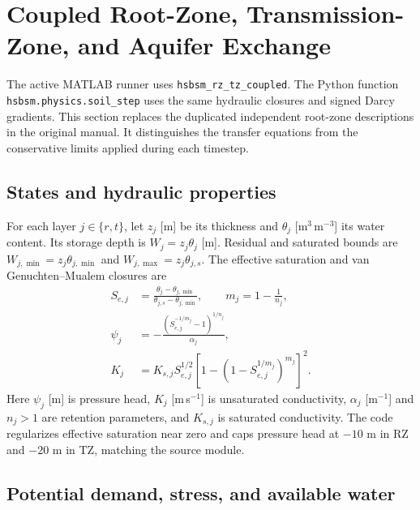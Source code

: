 \section{Coupled Root-Zone, Transmission-Zone, and Aquifer Exchange}
\label{sec:rootzone}
\label{subsec:tz_dynamics}

The active MATLAB runner uses \texttt{hsbsm\_rz\_tz\_coupled}. The Python function \texttt{hsbsm.physics.soil\_step} uses the same hydraulic closures and signed Darcy gradients. This section replaces the duplicated independent root-zone descriptions in the original manual. It distinguishes the transfer equations from the conservative limits applied during each timestep.

\subsection{States and hydraulic properties}

For each layer $j\in\{r,t\}$, let $z_j$ [m] be its thickness and $\theta_j$ [m$^3$\,m$^{-3}$] its water content. Its storage depth is $W_j=z_j\theta_j$ [m]. Residual and saturated bounds are $W_{j,\min}=z_j\theta_{j,\min}$ and $W_{j,\max}=z_j\theta_{j,s}$. The effective saturation and van Genuchten--Mualem closures are
\begin{align}
S_{e,j}&=\frac{\theta_j-\theta_{j,\min}}{\theta_{j,s}-\theta_{j,\min}},\qquad m_j=1-\frac{1}{n_j},\\
\psi_j&=-\frac{(S_{e,j}^{-1/m_j}-1)^{1/n_j}}{\alpha_j},\\
K_j&=K_{s,j}S_{e,j}^{1/2}\left[1-(1-S_{e,j}^{1/m_j})^{m_j}\right]^2.
\end{align}
Here $\psi_j$ [m] is pressure head, $K_j$ [m\,s$^{-1}$] is unsaturated conductivity, $\alpha_j$ [m$^{-1}$] and $n_j>1$ are retention parameters, and $K_{s,j}$ is saturated conductivity. The code regularizes effective saturation near zero and caps pressure head at $-10$ m in RZ and $-20$ m in TZ, matching the source module.

\subsection{Potential demand, stress, and available water}
\label{subsec:rz_stress}
\label{subsec:sl_stress}

